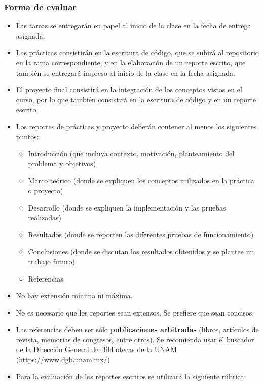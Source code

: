 \begin{frame}\frametitle{Forma de evaluar}
  \begin{itemize}
  \item Las tareas se entregarán en papel al inicio de la clase en la fecha de entrega asignada.
  \item Las prácticas consistirán en la escritura de código, que se subirá al repositorio en la rama correspondiente, y en la elaboración de un reporte escrito, que también se entregará impreso al inicio de la clase en la fecha asignada. 
  \item El proyecto final consistirá en la integración de los conceptos vistos en el curso, por lo que también consistirá en la escritura de código y en un reporte escrito.
  \item Los reportes de prácticas y proyecto deberán contener al menos los siguientes puntos:
    \begin{itemize}
    \item Introducción (que incluya contexto, motivación, planteamiento del problema y objetivos)
    \item Marco teórico (donde se expliquen los conceptos utilizados en la práctica o proyecto)
    \item Desarrollo (donde se expliquen la implementación y las pruebas realizadas)
    \item Resultados (donde se reporten las diferentes pruebas de funcionamiento)
    \item Conclusiones (donde se discutan los resultados obtenidos y se plantee un trabajo futuro)
    \item Referencias
    \end{itemize}
  \item No hay extensión mínima ni máxima.
  \item No es necesario que los reportes sean extensos. Se prefiere que sean concisos.
  \item Las referencias deben ser sólo \textbf{publicaciones arbitradas} (libros, artículos de revista, memorias de congresos, entre otros). Se recomienda usar el buscador de la Dirección General de Bibliotecas de la UNAM (\url{https://www.dgb.unam.mx/})
  \item Para la evaluación de los reportes escritos se utilizará la siguiente rúbrica:
  \end{itemize}
\end{frame}

